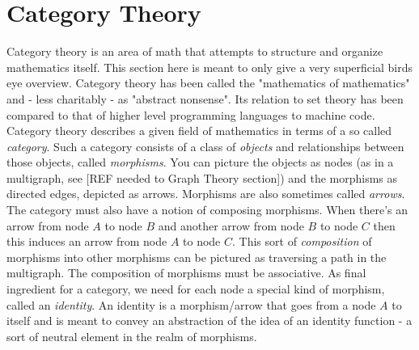 \chapter{Category Theory}

Category theory is an area of math that attempts to structure and organize mathematics itself. This section here is meant to only give a very superficial birds eye overview. Category theory has been called the "mathematics of mathematics" and - less charitably - as "abstract nonsense". Its relation to set theory has been compared to that of higher level programming languages to machine code. Category theory describes a given field of mathematics in terms of a so called \emph{category}. Such a category consists of a class of \emph{objects} and relationships between those objects, called \emph{morphisms}. You can picture the objects as nodes (as in a multigraph, see [REF needed to Graph Theory section]) and the morphisms as directed edges, depicted as arrows. Morphisms are also sometimes called \emph{arrows}. The category must also have a notion of composing morphisms. When there's an arrow from node $A$ to node $B$ and another arrow from node $B$ to node $C$ then this induces an arrow from node $A$ to node $C$. This sort of \emph{composition} of morphisms into other morphisms can be pictured as traversing a path in the multigraph. The composition of morphisms must be associative. As final ingredient for a category, we need for each node a special kind of morphism, called an \emph{identity}. An identity is a morphism/arrow that goes from a node $A$ to itself and is meant to convey an abstraction of the idea of an identity function - a sort of neutral element in the realm of morphisms.


